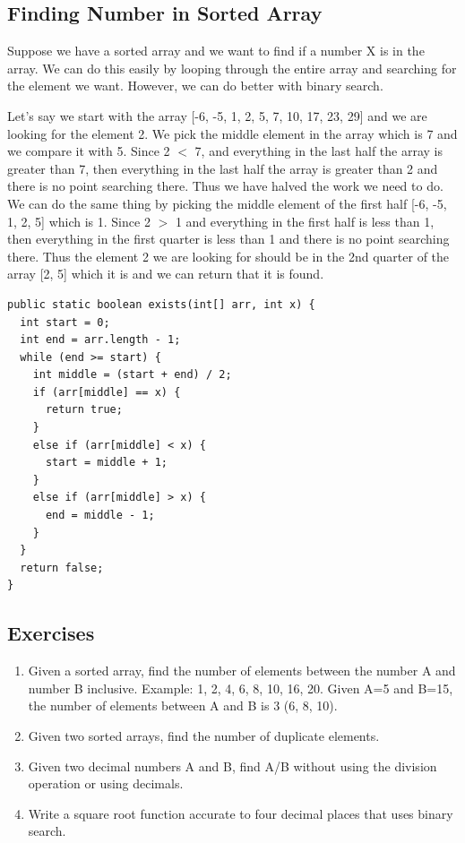 \documentclass[11pt,oneside]{book}
\begin{document}
\subsection{Finding Number in Sorted Array}

Suppose we have a sorted array and we want to find if a number X is in the array. We can do this easily by looping through the entire array and searching for the element we want. However, we can do better with binary search.

Let's say we start with the array [-6, -5, 1, 2, 5, 7, 10, 17, 23, 29] and we are looking for the element 2. We pick the middle element in the array which is 7 and we compare it with 5. Since 2 $<$ 7, and everything in the last half the array is greater than 7, then everything in the last half the array is greater than 2 and there is no point searching there. Thus we have halved the work we need to do. We can do the same thing by picking the middle element of the first half [-6, -5, 1, 2, 5] which is 1. Since 2 $>$ 1 and everything in the first half is less than 1, then everything in the first quarter is less than 1 and there is no point searching there. Thus the element 2 we are looking for should be in the 2nd quarter of the array [2, 5] which it is and we can return that it is found.

\begin{lstlisting}
public static boolean exists(int[] arr, int x) {
  int start = 0;
  int end = arr.length - 1;
  while (end >= start) {
    int middle = (start + end) / 2;
    if (arr[middle] == x) {
      return true;
    }
    else if (arr[middle] < x) {
      start = middle + 1;
    }
    else if (arr[middle] > x) {
      end = middle - 1;
    }
  }
  return false;
}
\end{lstlisting}

\subsection{Exercises}

\begin{enumerate}
\item Given a sorted array, find the number of elements between the number A and number B inclusive.
Example: 1, 2, 4, 6, 8, 10, 16, 20. Given A=5 and B=15, the number of elements between A and B is 3 (6, 8, 10).
\item Given two sorted arrays, find the number of duplicate elements.
\item Given two decimal numbers A and B, find A/B without using the division operation or using decimals.
\item Write a square root function accurate to four decimal places that uses binary search.
\end{enumerate}
\end{document}
